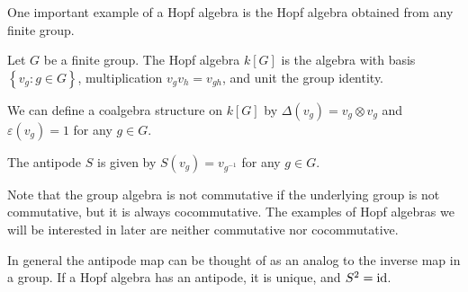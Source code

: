\begin{example}
    \label{groupalgebra}
    One important example of a Hopf algebra is the Hopf algebra obtained from
    any finite group. 

    Let $G$ be a finite group. The Hopf algebra $k[G]$ is the algebra with
    basis $\left\{ v_g: g \in G \right\}$, multiplication $v_g v_h = v_{gh}$,
    and unit the group identity. 

    We can define a coalgebra structure on $k[G]$ by $\Delta(v_g) = v_g \otimes v_g$
    and $\varepsilon(v_g) = 1$ for any $g \in G$.

    The antipode $S$ is given by $S(v_g) = v_{g^{-1}}$ for any $g \in G$.

    Note that the group algebra is not commutative if the underlying group is
    not commutative, but it is always cocommutative. The examples of Hopf
    algebras we will be interested in later are neither commutative nor
    cocommutative. 
\end{example}

In general the antipode map can be thought of as an analog to the inverse map
in a group. If a Hopf algebra has an antipode, it is unique, and $S^2 = \operatorname{id}$.

